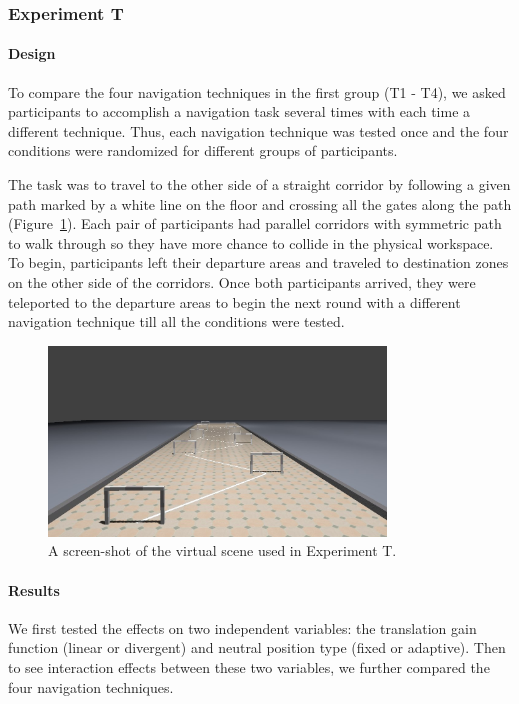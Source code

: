 \subsubsection{Experiment T}
\paragraph{Design}
To compare the four navigation techniques in the first group (T1 - T4), we asked participants to accomplish a navigation task several times with each time a different technique. Thus, each navigation technique was tested once and the four conditions were randomized for different groups of participants.

The task was to travel to the other side of a straight corridor by following a given path marked by a white line on the floor and crossing all the gates along the path (Figure~\ref{fig:3_task1}). Each pair of participants had parallel corridors with symmetric path to walk through so they have more chance to collide in the physical workspace. To begin, participants left their departure areas and traveled to destination zones on the other side of the corridors. Once both participants arrived, they were teleported to the departure areas to begin the next round with a different navigation technique till all the conditions were tested.

\begin{figure}[tb]
  \centering
  \includegraphics[width=0.8\textwidth]{figures/ch3/t1}
  \caption{\label{fig:3_task1}A screen-shot of the virtual scene used in Experiment T.}
\end{figure}

\paragraph{Results}
We first tested the effects on two independent variables: the translation gain function (linear or divergent) and neutral position type (fixed or adaptive). Then to see interaction effects between these two variables, we further compared the four navigation techniques.

